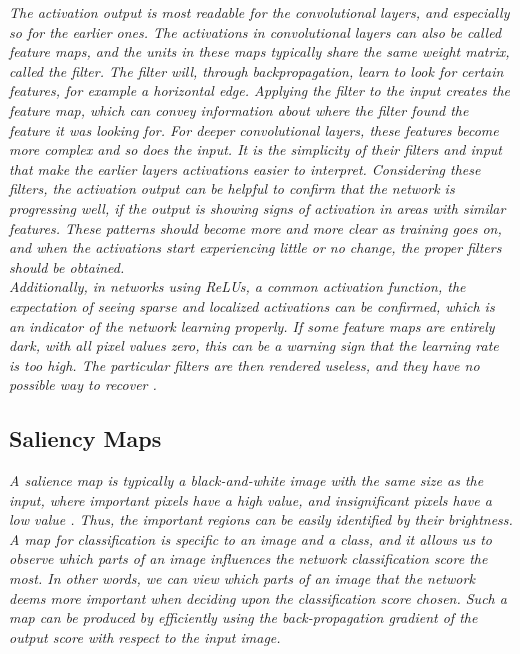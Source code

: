 \textit{The activation output is most readable for the convolutional layers, and especially so for the earlier ones. The activations in convolutional layers can also be called feature maps, and the units in these maps typically share the same weight matrix, called the filter. The filter will, through backpropagation, learn to look for certain features, for example a horizontal edge. Applying the filter to the input creates the feature map, which can convey information about where the filter found the feature it was looking for. For deeper convolutional layers, these features become more complex and so does the input. It is the simplicity of their filters and input that make the earlier layers activations easier to interpret. Considering these filters, the activation output can be helpful to confirm that the network is progressing well, if the output is showing signs of activation in areas with similar features. These patterns should become more and more clear as training goes on, and when the activations start experiencing little or no change, the proper filters should be obtained.} \\

\noindent \textit{Additionally, in networks using ReLUs, a common activation function, the expectation of seeing sparse and localized activations can be confirmed, which is an indicator of the network learning properly. If some feature maps are entirely dark, with all pixel values zero, this can be a warning sign that the learning rate is too high. The particular filters are then rendered useless, and they have no possible way to recover \cite{cs231n_act}. }

\subsection{Saliency Maps}

\textit{A salience map is typically a black-and-white image with the same size as the input, where important pixels have a high value, and insignificant pixels have a low value \cite{salience}. Thus, the important regions can be easily identified by their brightness. A map for classification is specific to an image and a class, and it allows us to observe which parts of an image influences the network classification score the most. In other words, we can view which parts of an image that the network deems more important when deciding upon the classification score chosen. Such a map can be produced by efficiently using the back-propagation gradient of the output score with respect to the input image.} \\

